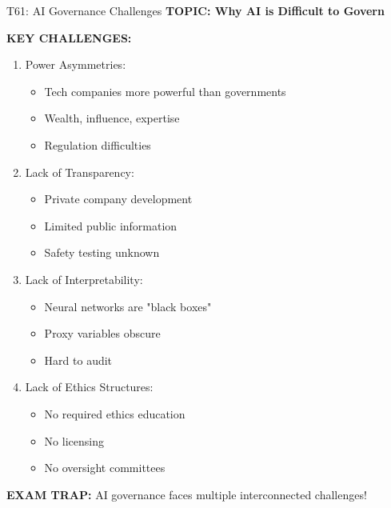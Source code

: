 \documentclass[8pt]{beamer}
\begin{document}
	
	\begin{frame}{T61: AI Governance Challenges}
		\fontsize{6.5}{7.5}\selectfont
		\textbf{TOPIC: Why AI is Difficult to Govern}
		
		\vspace{0.1cm}
		\textbf{KEY CHALLENGES:}
		\begin{enumerate}
			\item \textcolor{myblue}{Power Asymmetries:}
			\begin{itemize}
				\item Tech companies more powerful than governments
				\item Wealth, influence, expertise
				\item Regulation difficulties
			\end{itemize}
			\item \textcolor{myblue}{Lack of Transparency:}
			\begin{itemize}
				\item Private company development
				\item Limited public information
				\item Safety testing unknown
			\end{itemize}
			\item \textcolor{myblue}{Lack of Interpretability:}
			\begin{itemize}
				\item Neural networks are "black boxes"
				\item Proxy variables obscure
				\item Hard to audit
			\end{itemize}
			\item \textcolor{myblue}{Lack of Ethics Structures:}
			\begin{itemize}
				\item No required ethics education
				\item No licensing
				\item No oversight committees
			\end{itemize}
		\end{enumerate}
		
		\textcolor{myred}{\textbf{EXAM TRAP:}} AI governance faces \textcolor{myblue}{multiple interconnected challenges}!
	\end{frame}
	
\end{document}
